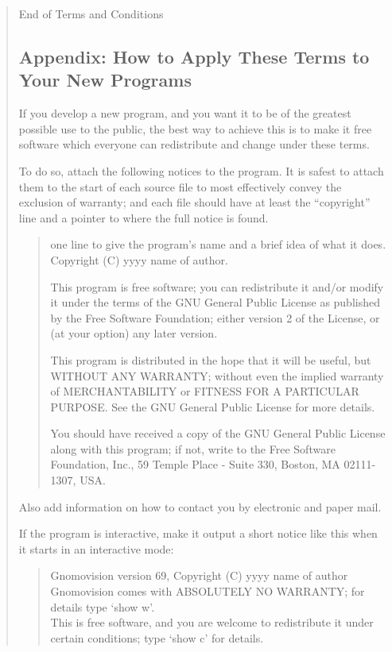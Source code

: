 \documentclass[twoside,11pt]{article}
\newcommand{\xlabel}[1]{}
\renewcommand{\_}{\texttt{\symbol{95}}}
\begin{document}
\begin{quote}
\begin{enumerate}
\end{enumerate}


\begin{center}
{\Large\sc End of Terms and Conditions}
\end{center}


\pagebreak[2]

\subsection{\label{terms}\xlabel{terms}Appendix: How to Apply These Terms to Your New Programs}

If you develop a new program, and you want it to be of the greatest
possible use to the public, the best way to achieve this is to make it
free software which everyone can redistribute and change under these
terms.

  To do so, attach the following notices to the program.  It is safest to
  attach them to the start of each source file to most effectively convey
  the exclusion of warranty; and each file should have at least the
  ``copyright'' line and a pointer to where the full notice is found.

\begin{quote}
one line to give the program's name and a brief idea of what it does.
Copyright (C) yyyy  name of author.

This program is free software; you can redistribute it and/or modify
it under the terms of the GNU General Public License as published by
the Free Software Foundation; either version 2 of the License, or
(at your option) any later version.

This program is distributed in the hope that it will be useful,
but WITHOUT ANY WARRANTY; without even the implied warranty of
MERCHANTABILITY or FITNESS FOR A PARTICULAR PURPOSE.  See the
GNU General Public License for more details.

You should have received a copy of the GNU General Public License
along with this program; if not, write to the Free Software
Foundation, Inc., 59 Temple Place - Suite 330, Boston, MA  02111-1307, USA.
\end{quote}

Also add information on how to contact you by electronic and paper mail.

If the program is interactive, make it output a short notice like this
when it starts in an interactive mode:

\begin{quote}
Gnomovision version 69, Copyright (C) yyyy  name of author \\
Gnomovision comes with ABSOLUTELY NO WARRANTY; for details type `show w'. \\
This is free software, and you are welcome to redistribute it
under certain conditions; type `show c' for details.
\end{quote}



\end{quote}
\end{document}
